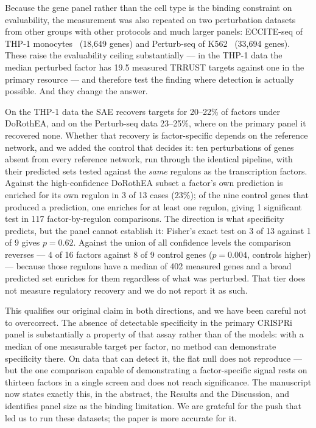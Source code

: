 \documentclass[11pt]{article}
\begin{document}
Because the gene panel rather than the cell type is the binding constraint on evaluability, the
measurement was also repeated on two perturbation datasets from other groups with other protocols
and much larger panels: ECCITE-seq of THP-1 monocytes~\cite{papalexi2021eccite} (18,649 genes) and
Perturb-seq of K562~\cite{norman2019exploring} (33,694 genes). These raise the evaluability ceiling
substantially --- in the THP-1 data the median perturbed factor has 19.5 measured TRRUST targets
against one in the primary resource --- and therefore test the finding where detection is actually
possible. And they change the answer.

On the THP-1 data the SAE recovers targets for 20--22\% of factors under DoRothEA, and on the
Perturb-seq data 23--25\%, where on the primary panel it recovered none. Whether that recovery is
factor-specific depends on the reference network, and we added the control that decides it: ten
perturbations of genes absent from every reference network, run through the identical pipeline,
with their predicted sets tested against the \emph{same} regulons as the transcription factors.
Against the high-confidence DoRothEA subset a factor's own prediction is enriched for its own
regulon in 3 of 13 cases (23\%); of the nine control genes that produced a prediction, one enriches
for at least one regulon, giving 1 significant test in 117 factor-by-regulon comparisons. The
direction is what specificity predicts, but the panel cannot establish it: Fisher's exact test on
3 of 13 against 1 of 9 gives $p = 0.62$. Against the union of all confidence levels the comparison
reverses --- 4 of 16 factors against 8 of 9 control genes ($p = 0.004$, controls higher) --- because
those regulons have a median of 402 measured genes and a broad predicted set enriches for them
regardless of what was perturbed. That tier does not measure regulatory recovery and we do not
report it as such.

This qualifies our original claim in both directions, and we have been careful not to overcorrect.
The absence of detectable specificity in the primary CRISPRi panel is substantially a property of
that assay rather than of the models: with a median of one measurable target per factor, no method
can demonstrate specificity there. On data that can detect it, the flat null does not reproduce ---
but the one comparison capable of demonstrating a factor-specific signal rests on thirteen factors
in a single screen and does not reach significance. The manuscript now states exactly this, in the
abstract, the Results and the Discussion, and identifies panel size as the binding limitation. We are grateful for the push that led
us to run these datasets; the paper is more accurate for it.
\end{document}
